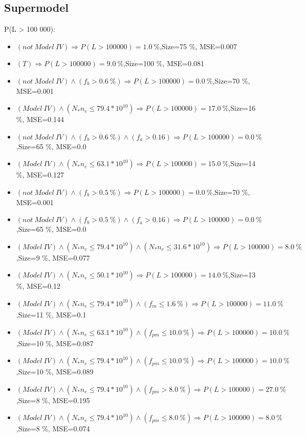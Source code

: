 \documentclass[numbered]{CSL}
\begin{document}
\subsection{Supermodel}
P(L > 100 000):
\begin{itemize}
\item $(not~Model~IV) \Rightarrow P(L > 100 000) = 1.0~\%$,\hfill Size=75 \%, MSE=0.007
\item $(T) \Rightarrow P(L > 100 000) = 9.0~\%$,\hfill Size=100 \%, MSE=0.081
\item $(not~Model~IV) \land (f_b > 0.6~\%) \Rightarrow P(L > 100 000) = 0.0~\%$,\hfill Size=70 \%, MSE=0.001
\item $(Model~IV) \land (N_* n_e \leq 79.4 * 10^{10}) \Rightarrow P(L > 100 000) = 17.0~\%$,\hfill Size=16 \%, MSE=0.144
\item $(not~Model~IV) \land (f_b > 0.6~\%) \land (f_a > 0.16) \Rightarrow P(L > 100 000) = 0.0~\%$,\hfill Size=65 \%, MSE=0.0
\item $(Model~IV) \land (N_* n_e \leq 63.1 * 10^{10}) \Rightarrow P(L > 100 000) = 15.0~\%$,\hfill Size=14 \%, MSE=0.127
\item $(not~Model~IV) \land (f_b > 0.5~\%) \Rightarrow P(L > 100 000) = 0.0~\%$,\hfill Size=70 \%, MSE=0.001
\item $(not~Model~IV) \land (f_b > 0.5~\%) \land (f_a > 0.16) \Rightarrow P(L > 100 000) = 0.0~\%$,\hfill Size=65 \%, MSE=0.0
\item $(Model~IV) \land (N_* n_e \leq 79.4 * 10^{10}) \land (N_* n_e \leq 31.6 * 10^{10}) \Rightarrow P(L > 100 000) = 8.0~\%$,\hfill Size=9 \%, MSE=0.077
\item $(Model~IV) \land (N_* n_e \leq 50.1 * 10^{10}) \Rightarrow P(L > 100 000) = 14.0~\%$,\hfill Size=13 \%, MSE=0.12
\item $(Model~IV) \land (N_* n_e \leq 79.4 * 10^{10}) \land (f_m \leq 1.6~\%) \Rightarrow P(L > 100 000) = 11.0~\%$,\hfill Size=11 \%, MSE=0.1
\item $(Model~IV) \land (N_* n_e \leq 63.1 * 10^{10}) \land (f_{pm} \leq 10.0~\%) \Rightarrow P(L > 100 000) = 10.0~\%$,\hfill Size=10 \%, MSE=0.087
\item $(Model~IV) \land (N_* n_e \leq 79.4 * 10^{10}) \land (f_{pm} \leq 10.0~\%) \Rightarrow P(L > 100 000) = 10.0~\%$,\hfill Size=10 \%, MSE=0.089
\item $(Model~IV) \land (N_* n_e \leq 79.4 * 10^{10}) \land (f_{pm} > 8.0~\%) \Rightarrow P(L > 100 000) = 27.0~\%$,\hfill Size=8 \%, MSE=0.195
\item $(Model~IV) \land (N_* n_e \leq 79.4 * 10^{10}) \land (f_{pm} \leq 8.0~\%) \Rightarrow P(L > 100 000) = 8.0~\%$,\hfill Size=8 \%, MSE=0.074

\end{itemize}
\end{document}
